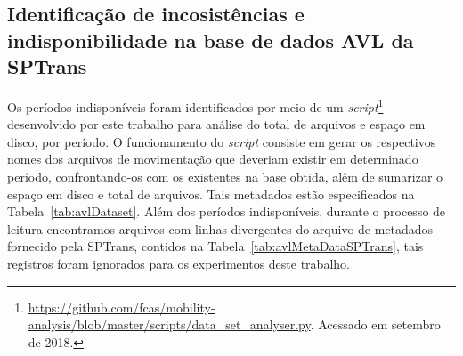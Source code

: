 \documentclass[
	12pt,				%
	oneside,			%
	a4paper,			%
	english,			%
	brazil				%
	]{abntex2ppgsi}
\begin{document}
{{{\subsection{Identificação de incosistências e indisponibilidade na base de dados AVL da  SPTrans}

Os períodos indisponíveis foram identificados por meio de um \textit{script}\footnote{\url{https://github.com/fcas/mobility-analysis/blob/master/scripts/data_set_analyser.py}. Acessado em setembro de 2018.} desenvolvido por este trabalho para análise do total de arquivos e espaço em disco, por período. O funcionamento do \textit{script} consiste em gerar os respectivos nomes dos arquivos de movimentação que deveriam existir em determinado período, confrontando-os com os existentes na base obtida, além de sumarizar o espaço em disco e total de arquivos. Tais metadados estão especificados na Tabela~\ref{tab:avlDataset}. Além dos períodos indisponíveis, durante o processo de leitura encontramos arquivos com linhas divergentes do arquivo de metadados fornecido pela SPTrans, contidos na Tabela~\ref{tab:avlMetaDataSPTrans}, tais registros foram ignorados para os experimentos deste trabalho.

}}}
\end{document}
